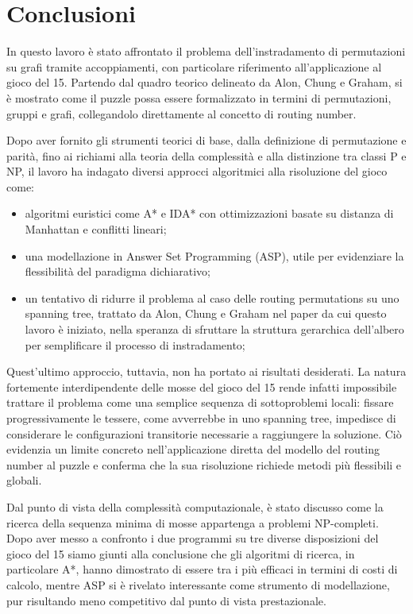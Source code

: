 \chapter{Conclusioni}

In questo lavoro è stato affrontato il problema dell’instradamento di permutazioni su grafi tramite accoppiamenti, con particolare riferimento all’applicazione al gioco del 15. Partendo dal quadro teorico delineato da Alon, Chung e Graham, si è mostrato come il puzzle possa essere formalizzato in termini di permutazioni, gruppi e grafi, collegandolo direttamente al concetto di routing number.

Dopo aver fornito gli strumenti teorici di base, dalla definizione di permutazione e parità, fino ai richiami alla teoria della complessità e alla distinzione tra classi P e NP, il lavoro ha indagato diversi approcci algoritmici alla risoluzione del gioco come:
\begin{itemize}
    \item algoritmi euristici come A* e IDA*  con ottimizzazioni basate su distanza di Manhattan e conflitti lineari;
    \item una modellazione in Answer Set Programming (ASP), utile per evidenziare la flessibilità del paradigma dichiarativo;
    \item un tentativo di ridurre il problema al caso delle routing permutations su uno spanning tree, trattato da Alon, Chung e Graham nel paper da cui questo lavoro è iniziato, nella speranza di sfruttare la struttura gerarchica dell’albero per semplificare il processo di instradamento;
\end{itemize}

Quest’ultimo approccio, tuttavia, non ha portato ai risultati desiderati. La natura fortemente interdipendente delle mosse del gioco del 15 rende infatti impossibile trattare il problema come una semplice sequenza di sottoproblemi locali: fissare progressivamente le tessere, come avverrebbe in uno spanning tree, impedisce di considerare le configurazioni transitorie necessarie a raggiungere la soluzione. Ciò evidenzia un limite concreto nell’applicazione diretta del modello del routing number al puzzle e conferma che la sua risoluzione richiede metodi più flessibili e globali.

Dal punto di vista della complessità computazionale, è stato discusso come la ricerca della sequenza minima di mosse appartenga a problemi NP-completi. Dopo aver messo a confronto i due programmi su tre diverse disposizioni del gioco del 15 siamo giunti alla conclusione che gli algoritmi di ricerca, in particolare A*, hanno dimostrato di essere tra i più efficaci in termini di costi di calcolo, mentre ASP si è rivelato interessante come strumento di modellazione, pur risultando meno competitivo dal punto di vista prestazionale.

